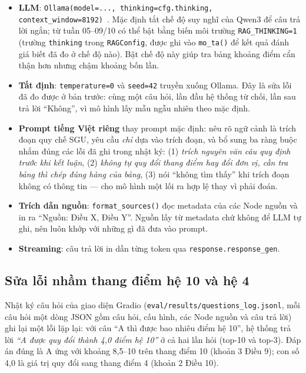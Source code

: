 \begin{itemize}
  \item \textbf{LLM}: \texttt{Ollama(model=..., thinking=cfg.thinking, context\_window=8192)}~\cite{ollama,qwen3}.
        Mặc định tắt chế độ suy nghĩ của Qwen3 để câu trả lời ngắn; từ tuần 05--09/10 có thể bật bằng
        biến môi trường \texttt{RAG\_THINKING=1} (trường \texttt{thinking} trong \texttt{RAGConfig}, được
        ghi vào \texttt{mo\_ta()} để kết quả đánh giá biết đã đo ở chế độ nào). Bật chế độ này giúp
        tra bảng khoảng điểm cẩn thận hơn nhưng chậm khoảng bốn lần.
  \item \textbf{Tất định}: \texttt{temperature=0} và \texttt{seed=42} truyền xuống Ollama. Đây là
        sửa lỗi đã đo được ở bản trước: cùng một câu hỏi, lần đầu hệ thống từ chối, lần sau trả lời
        ``Không'', vì mô hình lấy mẫu ngẫu nhiên theo mặc định.
  \item \textbf{Prompt tiếng Việt riêng} thay prompt mặc định: nêu rõ ngữ cảnh là trích đoạn quy chế
        SGU, yêu cầu \emph{chỉ} dựa vào trích đoạn, và bổ sung ba ràng buộc nhắm đúng các lỗi đã ghi
        trong nhật ký: (1) \emph{trích nguyên văn câu quy định trước khi kết luận}, (2) \emph{không
        tự quy đổi thang điểm hay đổi đơn vị, cần tra bảng thì chép đúng hàng của bảng},
        (3) nói ``không tìm thấy'' khi trích đoạn không có thông tin --- cho mô hình một lối ra hợp
        lệ thay vì phải đoán.
  \item \textbf{Trích dẫn nguồn}: \texttt{format\_sources()} đọc metadata của các Node nguồn và in ra
        ``Nguồn: Điều X, Điều Y''. Nguồn lấy từ metadata chứ không để LLM tự ghi, nên luôn khớp với
        những gì đã đưa vào prompt.
  \item \textbf{Streaming}: câu trả lời in dần từng token qua \texttt{response.response\_gen}.
\end{itemize}

\subsection{Sửa lỗi nhầm thang điểm hệ 10 và hệ 4}
\label{sec:nham-thang-diem}

Nhật ký câu hỏi của giao diện Gradio (\texttt{eval/results/questions\_log.jsonl}, mỗi câu hỏi một dòng
JSON gồm câu hỏi, cấu hình, các Node nguồn và câu trả lời) ghi lại một lỗi lặp lại: với câu ``A thì
được bao nhiêu điểm hệ 10'', hệ thống trả lời \emph{``A được quy đổi thành 4,0 điểm hệ 10''} ở cả hai
lần hỏi (top-10 và top-3). Đáp án đúng là A ứng với khoảng 8,5--10 trên thang điểm 10 (khoản 3
Điều 9); con số 4,0 là giá trị quy đổi sang thang điểm 4 (khoản 2 Điều 10).

